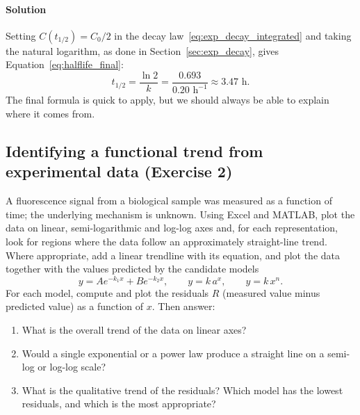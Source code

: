 \paragraph{Solution} Setting $C(t_{1/2}) = C_0/2$ in the decay law~\eqref{eq:exp_decay_integrated} and taking the natural logarithm, as done in Section~\ref{sec:exp_decay}, gives Equation~\eqref{eq:halflife_final}:
\begin{equation*}
t_{1/2} = \frac{\ln 2}{k} = \frac{0.693}{0.20\text{ h}^{-1}} \approx 3.47\text{ h}.
\end{equation*}
The final formula is quick to apply, but we should always be able to explain where it comes from.

\subsection{Identifying a functional trend from experimental data (Exercise 2)}
\label{ex:functional_trend}

A fluorescence signal from a biological sample was measured as a function of time; the underlying mechanism is unknown. Using Excel and MATLAB, plot the data on linear, semi-logarithmic and log-log axes and, for each representation, look for regions where the data follow an approximately straight-line trend. Where appropriate, add a linear trendline with its equation, and plot the data together with the values predicted by the candidate models
\begin{equation*}
y = Ae^{-k_1x} + Be^{-k_2x}, \qquad y = k\,a^x, \qquad y = k\,x^n.
\end{equation*}
For each model, compute and plot the residuals $R$ (measured value minus predicted value) as a function of $x$. Then answer:
\begin{enumerate}[label=(\arabic*)]
    \item What is the overall trend of the data on linear axes?
    \item Would a single exponential or a power law produce a straight line on a semi-log or log-log scale?
    \item What is the qualitative trend of the residuals? Which model has the lowest residuals, and which is the most appropriate?
\end{enumerate}

